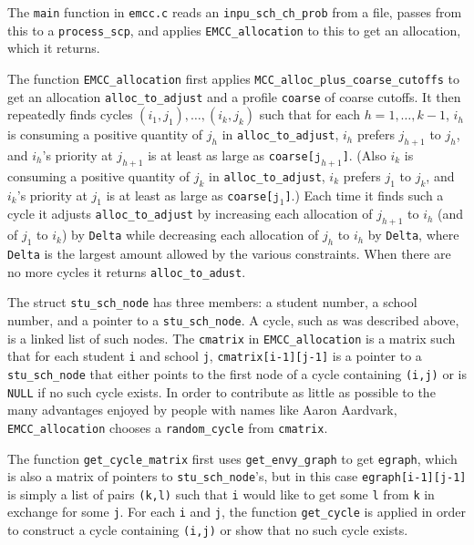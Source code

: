 \documentclass[12pt]{article}
\theoremstyle{definition}
\begin{document}
\begin{appendix}
The \texttt{main} function in \texttt{emcc.c} reads an
\texttt{inpu\_sch\_ch\_prob} from a file, passes from this to a
\texttt{process\_scp}, and applies \texttt{EMCC\_allocation} to this
to get an allocation, which it returns.

The function \texttt{EMCC\_allocation} first applies
\texttt{MCC\_alloc\_plus\_coarse\_cutoffs} to get an allocation
\texttt{alloc\_to\_adjust} and a profile \texttt{coarse} of coarse
cutoffs.  It then repeatedly finds cycles $(i_1,j_1), \ldots,
(i_k,j_k)$ such that for each $h = 1, \ldots, k-1$, $i_h$ is consuming
a positive quantity of $j_h$ in \texttt{alloc\_to\_adjust}, $i_h$
prefers $j_{h+1}$ to $j_h$, and $i_h$'s priority at $j_{h+1}$ is at
least as large as \texttt{coarse[$\texttt{j}_{h+1}$]}.  (Also $i_k$ is
consuming a positive quantity of $j_k$ in \texttt{alloc\_to\_adjust},
$i_k$ prefers $j_1$ to $j_k$, and $i_k$'s priority at $j_1$ is at
least as large as \texttt{coarse[$\texttt{j}_1$]}.)  Each time it
finds such a cycle it adjusts \texttt{alloc\_to\_adjust} by increasing
each allocation of $j_{h+1}$ to $i_h$ (and of $j_1$ to $i_k$) by
\texttt{Delta} while decreasing each allocation of $j_h$ to $i_h$ by
\texttt{Delta}, where \texttt{Delta} is the largest amount allowed by
the various constraints.  When there are no more cycles it returns
\texttt{alloc\_to\_adust}.

The struct \texttt{stu\_sch\_node} has three members: a student
number, a school number, and a pointer to a \texttt{stu\_sch\_node}.
A cycle, such as was described above, is a linked list of such
nodes. The \texttt{cmatrix} in \texttt{EMCC\_allocation} is a matrix
such that for each student \texttt{i} and school \texttt{j},
\texttt{cmatrix[i-1][j-1]} is a pointer to a \texttt{stu\_sch\_node}
that either points to the first node of a cycle containing
\texttt{(i,j)} or is \texttt{NULL} if no such cycle exists.  In order
to contribute as little as possible to the many advantages enjoyed by
people with names like Aaron Aardvark, \texttt{EMCC\_allocation}
chooses a \texttt{random\_cycle} from \texttt{cmatrix}.

The function \texttt{get\_cycle\_matrix} first uses
\texttt{get\_envy\_graph} to get \texttt{egraph}, which is also a
matrix of pointers to \texttt{stu\_sch\_node}'s, but in this case
\texttt{egraph[i-1][j-1]} is simply a list of pairs \texttt{(k,l)}
such that \texttt{i} would like to get some \texttt{l} from \texttt{k}
in exchange for some \texttt{j}.  For each \texttt{i} and \texttt{j},
the function \texttt{get\_cycle} is applied in order to construct a
cycle containing \texttt{(i,j)} or show that no such cycle exists.


\end{appendix}
\end{document}
